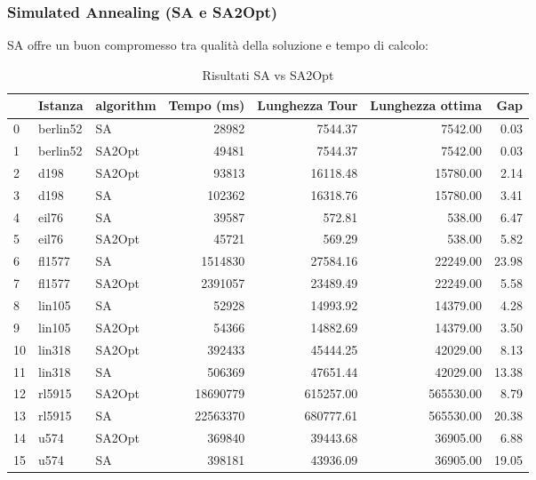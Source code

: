 \subsubsection{Simulated Annealing (SA e SA2Opt)}
SA offre un buon compromesso tra qualità della soluzione e tempo di calcolo:


\begin{table}[H]
	\centering
	\caption{Risultati SA vs SA2Opt}
	\begin{tabular}{lllrrrr}
		\toprule
		   & Istanza  & algorithm & Tempo (ms) & Lunghezza Tour & Lunghezza ottima & Gap   \\
		\midrule
		0  & berlin52 & SA        & 28982      & 7544.37        & 7542.00          & 0.03  \\
		1  & berlin52 & SA2Opt    & 49481      & 7544.37        & 7542.00          & 0.03  \\
		2  & d198     & SA2Opt    & 93813      & 16118.48       & 15780.00         & 2.14  \\
		3  & d198     & SA        & 102362     & 16318.76       & 15780.00         & 3.41  \\
		4  & eil76    & SA        & 39587      & 572.81         & 538.00           & 6.47  \\
		5  & eil76    & SA2Opt    & 45721      & 569.29         & 538.00           & 5.82  \\
		6  & fl1577   & SA        & 1514830    & 27584.16       & 22249.00         & 23.98 \\
		7  & fl1577   & SA2Opt    & 2391057    & 23489.49       & 22249.00         & 5.58  \\
		8  & lin105   & SA        & 52928      & 14993.92       & 14379.00         & 4.28  \\
		9  & lin105   & SA2Opt    & 54366      & 14882.69       & 14379.00         & 3.50  \\
		10 & lin318   & SA2Opt    & 392433     & 45444.25       & 42029.00         & 8.13  \\
		11 & lin318   & SA        & 506369     & 47651.44       & 42029.00         & 13.38 \\
		12 & rl5915   & SA2Opt    & 18690779   & 615257.00      & 565530.00        & 8.79  \\
		13 & rl5915   & SA        & 22563370   & 680777.61      & 565530.00        & 20.38 \\
		14 & u574     & SA2Opt    & 369840     & 39443.68       & 36905.00         & 6.88  \\
		15 & u574     & SA        & 398181     & 43936.09       & 36905.00         & 19.05 \\
		\bottomrule
	\end{tabular}
\end{table}


